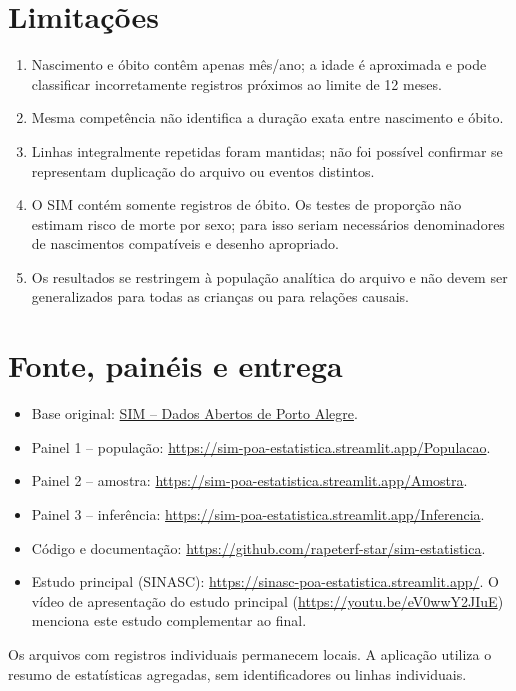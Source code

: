 \documentclass[12pt]{article}
\begin{document}
\section{Limitações}

\begin{enumerate}
    \item Nascimento e óbito contêm apenas mês/ano; a idade é aproximada e pode classificar incorretamente registros próximos ao limite de 12 meses.
    \item Mesma competência não identifica a duração exata entre nascimento e óbito.
    \item Linhas integralmente repetidas foram mantidas; não foi possível confirmar se representam duplicação do arquivo ou eventos distintos.
    \item O SIM contém somente registros de óbito. Os testes de proporção não estimam risco de morte por sexo; para isso seriam necessários denominadores de nascimentos compatíveis e desenho apropriado.
    \item Os resultados se restringem à população analítica do arquivo e não devem ser generalizados para todas as crianças ou para relações causais.
\end{enumerate}

\section{Fonte, painéis e entrega}

\begin{itemize}
    \item Base original: \href{https://dadosabertos.poa.br/dataset/mortalidade-e-obitos}{SIM -- Dados Abertos de Porto Alegre}.
    \item Painel 1 -- população: \url{https://sim-poa-estatistica.streamlit.app/Populacao}.
    \item Painel 2 -- amostra: \url{https://sim-poa-estatistica.streamlit.app/Amostra}.
    \item Painel 3 -- inferência: \url{https://sim-poa-estatistica.streamlit.app/Inferencia}.
    \item Código e documentação: \url{https://github.com/rapeterf-star/sim-estatistica}.
    \item Estudo principal (SINASC): \url{https://sinasc-poa-estatistica.streamlit.app/}. O vídeo de apresentação do estudo principal (\url{https://youtu.be/eV0wwY2JIuE}) menciona este estudo complementar ao final.
\end{itemize}

Os arquivos com registros individuais permanecem locais. A aplicação utiliza o resumo de estatísticas agregadas, sem identificadores ou linhas individuais.
\end{document}
